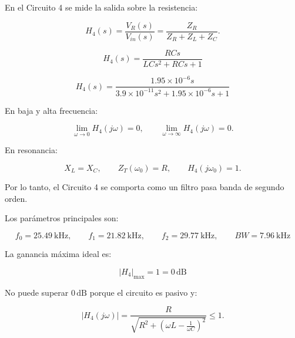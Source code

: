 En el Circuito 4 se mide la salida sobre la resistencia:

\begin{equation}
    H_4(s)=\frac{V_R(s)}{V_{in}(s)}
    =
    \frac{Z_R}{Z_R+Z_L+Z_C}.
\end{equation}

\begin{equation}
    \boxed{
    H_4(s)=
    \frac{RCs}
    {LCs^2+RCs+1}
    }
\end{equation}

\begin{equation}
    \boxed{
    H_4(s)=
    \frac{1.95\times10^{-6}s}
    {3.9\times10^{-11}s^2+1.95\times10^{-6}s+1}
    }
\end{equation}

En baja y alta frecuencia:

\begin{equation}
    \lim_{\omega\to0}H_4(j\omega)=0,
    \qquad
    \lim_{\omega\to\infty}H_4(j\omega)=0.
\end{equation}

En resonancia:

\begin{equation}
    X_L=X_C,
    \qquad
    Z_T(\omega_0)=R,
    \qquad
    H_4(j\omega_0)=1.
\end{equation}

Por lo tanto, el Circuito 4 se comporta como un filtro pasa banda de segundo orden.

Los parámetros principales son:

\begin{equation}
    \boxed{
    f_0=\SI{25.49}{\kilo\hertz},
    \qquad
    f_1=\SI{21.82}{\kilo\hertz},
    \qquad
    f_2=\SI{29.77}{\kilo\hertz},
    \qquad
    BW=\SI{7.96}{\kilo\hertz}
    }
\end{equation}

La ganancia máxima ideal es:

\begin{equation}
    \boxed{
    |H_4|_{\max}=1=0\,\mathrm{dB}
    }
\end{equation}

No puede superar $0\,\mathrm{dB}$ porque el circuito es pasivo y:

\begin{equation}
    |H_4(j\omega)|=
    \frac{R}
    {
    \sqrt{
    R^2+
    \left(\omega L-\frac{1}{\omega C}\right)^2
    }
    }
    \le 1.
\end{equation}

\begin{table}[H]
\centering
\caption{$H_4(s)$}
\label{tab:circuito4_parametros}
\end{table}

